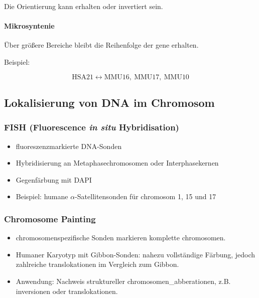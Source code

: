 Die Orientierung kann erhalten oder invertiert sein.

\paragraph{Mikrosyntenie}

Über größere Bereiche bleibt die Reihenfolge der \gls{gen}e erhalten.

Beispiel:

\[
    \mathrm{HSA21}
    \longleftrightarrow
    \mathrm{MMU16,\ MMU17,\ MMU10}
\]



\subsection*{Lokalisierung von DNA im Chromosom}\label{subsec:lokalisierung-von-dna-im-chromosom}

\subsubsection*{FISH
    (Fluorescence \emph{in situ} Hybridisation)}

\begin{itemize}
    \item fluoreszenzmarkierte DNA-Sonden
    \item Hybridisierung an Metaphasechromosomen
    oder Interphasekernen
    \item Gegenfärbung mit DAPI
    \item Beispiel:
    humane $\alpha$-Satellitensonden
    für \gls{chromosom} 1, 15 und 17
\end{itemize}

\subsubsection*{Chromosome Painting}

\begin{itemize}
    \item chromosomenspezifische Sonden markieren
    komplette \gls{chromosom}en.

    \item Humaner Karyotyp mit Gibbon-Sonden:
    nahezu vollständige Färbung,
    jedoch zahlreiche \gls{translokation}en
    im Vergleich zum Gibbon.

    \item Anwendung:
    Nachweis struktureller \gls{chromosomen_abberation}en,
    z.B. \gls{inversion}en oder \gls{translokation}en.
\end{itemize}

